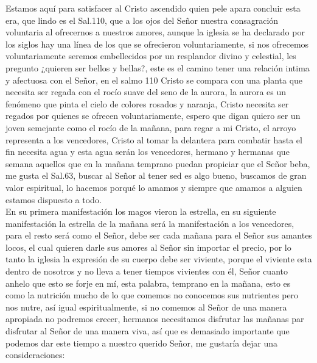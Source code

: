 \documentclass[12pt]{article}
\begin{document}
Estamos aquí para satisfacer al Cristo ascendido quien pele apara concluir esta era, que lindo es el Sal.110, que a los ojos del Señor nuestra consagración voluntaria al ofrecernos a nuestros amores, aunque la iglesia se ha declarado por los siglos hay una línea de los que se ofrecieron voluntariamente, si nos ofrecemos voluntariamente seremos embellecidos por un resplandor divino y celestial, les pregunto ¿quieren ser bellos y bellas?, este es el camino tener una relación intima y afectuosa con el Señor, en el salmo 110 Cristo se compara con una planta que necesita ser regada con el rocío suave del seno de la aurora, la aurora es un fenómeno que pinta el cielo de colores rosados y naranja, Cristo necesita ser regados por quienes se ofrecen voluntariamente, espero que digan quiero ser un joven semejante como el rocío de la mañana, para regar a mi Cristo, el arroyo representa a los vencedores, Cristo al tomar la delantera para combatir hasta el fin necesita agua y esta agua serán los vencedores, hermano y hermanas que semana aquellos que en la mañana temprano puedan propiciar que el Señor beba, me gusta el Sal.63, buscar al Señor al tener sed es algo bueno, buscamos de gran valor espiritual, lo hacemos porqué lo amamos y siempre que amamos a alguien estamos dispuesto a todo.\\

En su primera manifestación los magos vieron la estrella, en su siguiente manifestación la estrella de la mañana será la manifestación a los vencedores, para el resto será como el Señor, debe ser cada mañana para el Señor sus amantes locos, el cual quieren darle sus amores al Señor sin importar el precio, por lo tanto la iglesia la expresión de su cuerpo debe ser viviente, porque el viviente esta dentro de nosotros y no lleva a tener tiempos vivientes con él, Señor cuanto anhelo que esto se forje en mí, esta palabra, temprano en la mañana, esto es como la nutrición mucho de lo que comemos no conocemos sus nutrientes pero nos nutre, así igual espiritualmente, si no comemos al Señor de una manera apropiada no podremos crecer, hermanos necesitamos disfrutar las mañanas par disfrutar al Señor de una manera viva, así que es demasiado importante que podemos dar este tiempo a nuestro querido Señor, me gustaría dejar una consideraciones:\\
\end{document}
